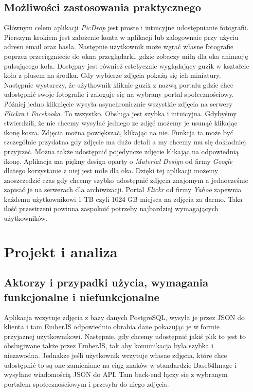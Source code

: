 \documentclass[brudnopis]{xmgr}
\begin{document}
\section{Możliwości zastosowania praktycznego}
Głównym celem aplikacji \textit{PicDrop} jest proste i intuicyjne udostępnianie fotografii. Pierszym krokiem jest założenie konta w aplikacji lub zalogownaie przy użyciu adresu email oraz hasła. Następnie użytkownik może wgrać własne fotografie poprzez przeciągniecie do okna przeglądarki, gdzie zobaczy miłą dla oka animację pulsującego koła. Dostępny jest również estetycznie wyglądający guzik w kształcie koła z plusem na środku. Gdy wybierze zdjęcia pokażą się ich miniatury. Następnie wystarczy, że użytkownik kliknie guzik z nazwą portalu gdzie chce udostępnić swoje fotografie i zaloguje się na wybrany portal społecznościowy. Później jedno kliknięcie wysyła asynchronicznie wszystkie zdjęcia na serwery \textit{Flickra} i \textit{Facebooka}. To wszystko. Obsługa jest szybka i intuicyjna. Gdybyśmy stwierdzili, że nie chcemy wysyłać jednego ze zdjęć możemy je usunąć klikając ikonę kosza. Zdjęcia można powiększać, klikając na nie. Funkcja ta może być szczególnie przydatna gdy zdjęcie ma dużo detali a my chcemy mu się dokładniej przyjrzeć. Można także udostępnić pojedyncze zdjęcie klikając na  odpowiednią ikonę. Aplikacja ma piękny design oparty o \textit{Material Design} od firmy \textit{Google} dlatego korzystanie z niej jest miłe dla oka. Dzięki tej aplikacji możemy zaoszczędzić czas gdy chcemy szybko udostępnić zdjęcia znajomym a jednocześnie zapisać je na serwerach dla archiwizacji. Portal \textit{Flickr} od firmy \textit{Yahoo} zapewnia każdemu użytkownikowi 1 TB czyli 1024 GB miejsca na zdjęcia za darmo. Taka ilość przestrzeni powinna zaspokoić potrzeby najbardziej wymagających użytkowników.

\chapter{Projekt i analiza}
\section{Aktorzy i przypadki użycia, wymagania funkcjonalne i niefunkcjonalne}
Aplikacja wczytuje zdjęcia z bazy danych PostgreSQL, wysyła je przez JSON do klienta i tam EmberJS odpowiednio obrabia dane pokazując je w formie przyjaznej użytkownikowi. Następnie, gdy chcemy udostępnić jakiś plik to jest to obsługiwane także przez EmberJS, tak aby komunikacja była szybka i niezawodna. Jednakże jeśli użytkownik wczytuje własne zdjęcia, które chce udostępnić to są one zamieniane na ciąg znaków w standardzie Base64Image i wysyłane wiadomością JSON do API. Tam back-end łączy się z wybranym portalem społecznościowym i przesyła do niego zdjęcia.
\end{document}
